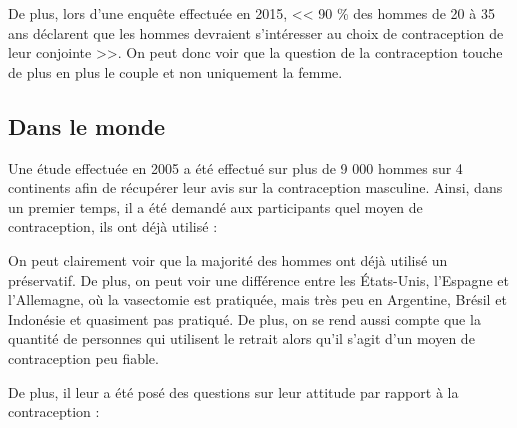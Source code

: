 \documentclass[12pt,a4paper]{report}
\begin{document}
De plus, lors d'une enquête effectuée en 2015, << 90 \% des hommes de 20 à 35 ans déclarent que les hommes devraient s’intéresser au choix de contraception de leur conjointe >>. \cite{JeunesFemmesSontelles2015} On peut donc voir que la question de la contraception touche de plus en plus le couple et non uniquement la femme.

\subsection{Dans le monde}

Une étude effectuée en 2005 a été effectué sur plus de 9 000 hommes sur 4 continents afin de récupérer leur avis sur la contraception masculine. Ainsi, dans un premier temps, il a été demandé aux participants quel moyen de contraception, ils ont déjà utilisé :

\begin{table}[htb]
\centering
{}
\caption{\label{table:contraceptionparpays}Pourcentage d'homme ayant déjà utilisé une méthode de contraception dans différents pays \cite{heinemannAttitudesMaleFertility2005}}
\end{table}

On peut clairement voir que la majorité des hommes ont déjà utilisé un préservatif. De plus, on peut voir une différence entre les États-Unis, l'Espagne et l'Allemagne, où la vasectomie est pratiquée, mais très peu en Argentine, Brésil et Indonésie et quasiment pas pratiqué. De plus, on se rend aussi compte que la quantité de personnes qui utilisent le retrait alors qu'il s'agit d'un moyen de contraception peu fiable.\cite{heinemannAttitudesMaleFertility2005}

De plus, il leur a été posé des questions sur leur attitude par rapport à la contraception :
\end{document}
